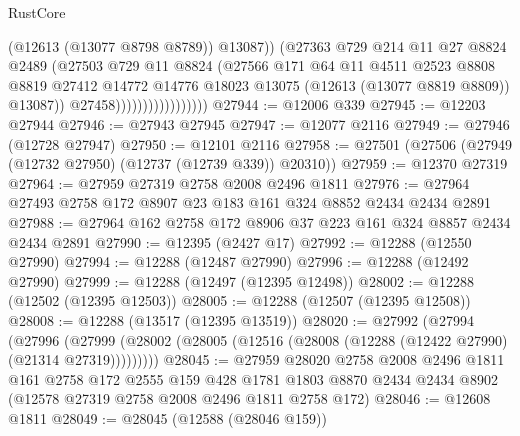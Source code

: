 \begin{lexlean}{RustCore}
\begin{coremodule}
                                        (@12613 (@13077 @8798 @8789))
                                        @13087))
                                    (@27363
                                      @729
                                      @214
                                      @11
                                      @27
                                      @8824
                                      @2489
                                      (@27503
                                        @729
                                        @11
                                        @8824
                                        (@27566
                                          @171
                                          @64
                                          @11
                                          @4511
                                          @2523
                                          @8808
                                          @8819
                                          @27412
                                          @14772
                                          @14776
                                          @18023
                                          @13075
                                          (@12613 (@13077 @8819 @8809))
                                          @13087))
                                      @27458)))))))))))))))))
@27944 := @12006 @339
@27945 := @12203 @27944
@27946 := @27943 @27945
@27947 := @12077 @2116
@27949 := @27946 (@12728 @27947)
@27950 := @12101 @2116
@27958 := @27501 (@27506 (@27949 (@12732 @27950) (@12737 (@12739 @339)) @20310))
@27959 := @12370 @27319
@27964 := @27959 @27319 @2758 @2008 @2496 @1811
@27976 := @27964 @27493 @2758 @172 @8907 @23 @183 @161 @324 @8852 @2434 @2434 @2891
@27988 := @27964 @162 @2758 @172 @8906 @37 @223 @161 @324 @8857 @2434 @2434 @2891
@27990 := @12395 (@2427 @17)
@27992 := @12288 (@12550 @27990)
@27994 := @12288 (@12487 @27990)
@27996 := @12288 (@12492 @27990)
@27999 := @12288 (@12497 (@12395 @12498))
@28002 := @12288 (@12502 (@12395 @12503))
@28005 := @12288 (@12507 (@12395 @12508))
@28008 := @12288 (@13517 (@12395 @13519))
@28020 := @27992
    (@27994
      (@27996
        (@27999 (@28002 (@28005 (@12516 (@28008 (@12288 (@12422 @27990) (@21314 @27319)))))))))
@28045 := @27959
    @28020
    @2758
    @2008
    @2496
    @1811
    @161
    @2758
    @172
    @2555
    @159
    @428
    @1781
    @1803
    @8870
    @2434
    @2434
    @8902
    (@12578 @27319 @2758 @2008 @2496 @1811 @2758 @172)
@28046 := @12608 @1811
@28049 := @28045 (@12588 (@28046 @159))

\end{coremodule}
\end{lexlean}
